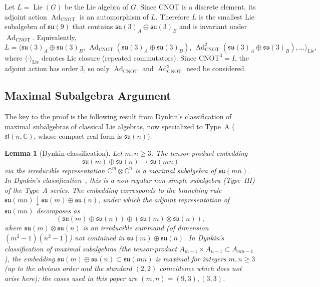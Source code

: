 \documentclass[12pt,a4paper]{article}
\newtheorem{lemma}[theorem]{Lemma}
\newcommand{\Ad}{\operatorname{Ad}}
\newcommand{\Lie}{\operatorname{Lie}}
\begin{document}
Let $L = \Lie(G)$ be the Lie algebra of $G$. Since $\text{CNOT}$ is a
discrete element, its adjoint action $\Ad_{\text{CNOT}}$ is an automorphism
of $L$. Therefore $L$ is the smallest Lie subalgebra of $\mathfrak{su}(9)$
that contains $\mathfrak{su}(3)_A \oplus \mathfrak{su}(3)_B$ and is
invariant under $\Ad_{\text{CNOT}}$. Equivalently,
\[
L = \big\langle \mathfrak{su}(3)_A \oplus \mathfrak{su}(3)_B,\,
\Ad_{\text{CNOT}}(\mathfrak{su}(3)_A \oplus \mathfrak{su}(3)_B),\,
\Ad_{\text{CNOT}}^2(\mathfrak{su}(3)_A \oplus \mathfrak{su}(3)_B),
\ldots \big\rangle_{\text{Lie}},
\]
where $\langle \cdot \rangle_{\text{Lie}}$ denotes Lie closure (repeated
commutators). Since $\text{CNOT}^3 = I$, the adjoint action has order 3,
so only $\Ad_{\text{CNOT}}$ and $\Ad_{\text{CNOT}}^2$ need be considered.

\subsection{Maximal Subalgebra Argument}

The key to the proof is the following result from Dynkin's classification
of maximal subalgebras of classical Lie algebras, now specialized to
Type~A ($\mathfrak{sl}(n,\mathbb{C})$, whose compact real form is
$\mathfrak{su}(n)$).

\begin{lemma}[Dynkin classification]
\label{lemma:dynkin}
Let $m,n \ge 3$. The tensor product embedding
\[
\mathfrak{su}(m) \oplus \mathfrak{su}(n) \to \mathfrak{su}(mn)
\]
via the irreducible representation $\mathbb{C}^m \otimes \mathbb{C}^n$
is a maximal subalgebra of $\mathfrak{su}(mn)$. In Dynkin's
classification~\cite{dynkin1952}, this is a \emph{non-regular
non-simple} subalgebra (Type~III) of the Type~A series.
The embedding corresponds to the branching rule
$\mathfrak{su}(mn) \downarrow \mathfrak{su}(m)\oplus\mathfrak{su}(n)$,
under which the adjoint representation of $\mathfrak{su}(mn)$ decomposes as
\[
(\mathfrak{su}(m) \oplus \mathfrak{su}(n)) \oplus
(\mathfrak{su}(m) \otimes \mathfrak{su}(n)),
\]
where $\mathfrak{su}(m)\otimes\mathfrak{su}(n)$ is an irreducible summand
(of dimension $(m^2-1)(n^2-1)$) not contained in
$\mathfrak{su}(m)\oplus\mathfrak{su}(n)$. In Dynkin's classification of
maximal subalgebras (the tensor-product $A_{m-1}\times A_{n-1}\subset
A_{mn-1}$), the embedding $\mathfrak{su}(m)\oplus\mathfrak{su}(n)\subset
\mathfrak{su}(mn)$ is maximal for integers $m,n\ge3$ (up to the obvious
order and the standard $(2,2)$ coincidence which does not arise here);
the cases used in this paper are $(m,n)=(9,3),(3,3)$.
\end{lemma}
\end{document}
